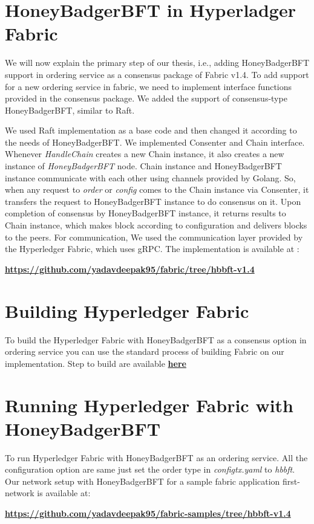 \section{HoneyBadgerBFT in Hyperladger Fabric}
We will now explain the primary step of our thesis, i.e., adding HoneyBadgerBFT support in ordering service as a consensus package of Fabric v1.4. To add support for a new ordering service in fabric, we need to implement interface functions provided in the consensus package. We added the support of consensus-type HoneyBadgerBFT, similar to Raft.


We used Raft implementation as a base code and then changed it according to the needs of HoneyBadgerBFT. We implemented Consenter and Chain interface. Whenever \textit{ HandleChain} creates a new Chain instance, it also creates a new instance of \textit{HoneyBadgerBFT} node. Chain instance and HoneyBadgerBFT instance communicate with each other using channels provided by Golang. So, when any request to \textit{order} or \textit{config} comes to the Chain instance via Consenter, it transfers the request to HoneyBadgerBFT instance to do consensus on it. Upon completion of consensus by HoneyBadgerBFT instance, it returns results to Chain instance, which makes block according to configuration and delivers blocks to the peers. For communication, We used the communication layer provided by the Hyperledger Fabric, which uses gRPC\cite{grpc}. The implementation is available at :

\href{https://github.com/yadavdeepak95/fabric/tree/hbbft-v1.4}{\textbf{https://github.com/yadavdeepak95/fabric/tree/hbbft-v1.4}}


\section{Building Hyperledger Fabric} 
To build the Hyperledger Fabric with HoneyBadgerBFT as a consensus option in ordering service you can use the standard process of building Fabric on our implementation. Step to build are available \href{https://hyperledger-fabric.readthedocs.io/en/release-1.4/dev-setup/build.html}{\textbf{here}}
\section{Running Hyperledger Fabric with HoneyBadgerBFT}
 
To run Hyperledger Fabric with HoneyBadgerBFT as an ordering service. All the configuration option are same just set the order type in \textit{configtx.yaml} to \textit{hbbft}. Our network setup with HoneyBadgerBFT  for a sample fabric application first-network is available at:

\href{https://github.com/yadavdeepak95/fabric-samples/tree/hbbft-v1.4}{\textbf{https://github.com/yadavdeepak95/fabric-samples/tree/hbbft-v1.4}}